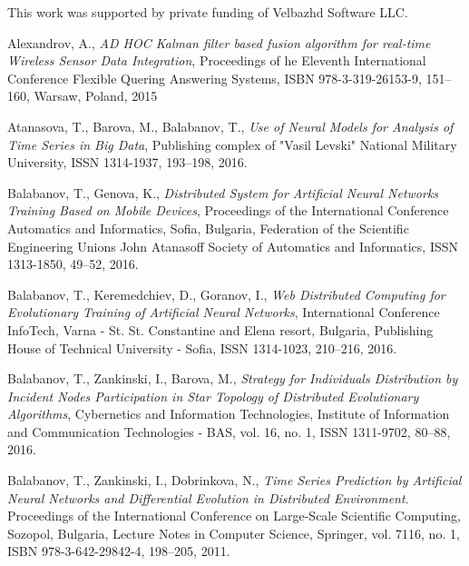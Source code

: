 \documentclass{llncs}
\begin{document}
This work was supported by private funding of Velbazhd Software LLC.


\begin{thebibliography}{99}

 Alexandrov, A., \textit{AD HOC Kalman filter based fusion algorithm for real-time Wireless Sensor Data Integration}, Proceedings of he Eleventh International Conference Flexible Quering Answering Systems, ISBN 978-3-319-26153-9, 151--160, Warsaw, Poland, 2015

 Atanasova, T., Barova, M., Balabanov, T., \textit{Use of Neural Models for Analysis of Time Series in Big Data}, Publishing complex of "Vasil Levski" National Military University, ISSN 1314-1937, 193--198, 2016.

 Balabanov, T., Genova, K., \textit{Distributed System for Artificial Neural Networks Training Based on Mobile Devices}, Proceedings of the International Conference Automatics and Informatics, Sofia, Bulgaria, Federation of the Scientific Engineering Unions John Atanasoff Society of Automatics and Informatics, ISSN 1313-1850, 49--52, 2016.

 Balabanov, T., Keremedchiev, D., Goranov, I., \textit{Web Distributed Computing for Evolutionary Training of Artificial Neural Networks}, International Conference InfoTech, Varna - St. St. Constantine and Elena resort, Bulgaria, Publishing House of Technical University - Sofia, ISSN 1314-1023, 210--216, 2016.

 Balabanov, T., Zankinski, I., Barova, M., \textit{Strategy for Individuals Distribution by Incident Nodes Participation in Star Topology of Distributed Evolutionary Algorithms}, Cybernetics and Information Technologies, Institute of Information and Communication Technologies - BAS, vol. 16, no. 1, ISSN 1311-9702, 80--88, 2016.

 Balabanov, T., Zankinski, I., Dobrinkova, N., \textit{Time Series Prediction by Artificial Neural Networks and Differential Evolution in Distributed Environment}. Proceedings of the International Conference on Large-Scale Scientific Computing, Sozopol, Bulgaria, Lecture Notes in Computer Science, Springer, vol. 7116, no. 1, ISBN 978-3-642-29842-4, 198–205, 2011. 


\end{thebibliography}
\end{document}

